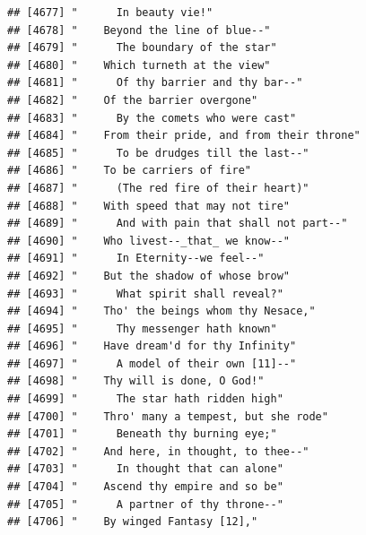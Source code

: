 \documentclass{article}\usepackage[]{graphicx}\usepackage[]{color}
\makeatletter
\newenvironment{kframe}{%
 \def\at@end@of@kframe{}%
 \ifinner\ifhmode%
  \def\at@end@of@kframe{\end{minipage}}%
  \begin{minipage}{\columnwidth}%
 \fi\fi%
 \def\FrameCommand##1{\hskip\@totalleftmargin \hskip-\fboxsep
 \colorbox{shadecolor}{##1}\hskip-\fboxsep
     \hskip-\linewidth \hskip-\@totalleftmargin \hskip\columnwidth}%
 \MakeFramed {\advance\hsize-\width
   \@totalleftmargin\z@ \linewidth\hsize
   \@setminipage}}%
 {\par\unskip\endMakeFramed%
 \at@end@of@kframe}
\newenvironment{knitrout}{}{} %
\makeatother
\begin{document}
\begin{knitrout}
\begin{kframe}
\begin{verbatim}
## [4677] "      In beauty vie!"                                                        
## [4678] "    Beyond the line of blue--"                                               
## [4679] "      The boundary of the star"                                              
## [4680] "    Which turneth at the view"                                               
## [4681] "      Of thy barrier and thy bar--"                                          
## [4682] "    Of the barrier overgone"                                                 
## [4683] "      By the comets who were cast"                                           
## [4684] "    From their pride, and from their throne"                                 
## [4685] "      To be drudges till the last--"                                         
## [4686] "    To be carriers of fire"                                                  
## [4687] "      (The red fire of their heart)"                                         
## [4688] "    With speed that may not tire"                                            
## [4689] "      And with pain that shall not part--"                                   
## [4690] "    Who livest--_that_ we know--"                                            
## [4691] "      In Eternity--we feel--"                                                
## [4692] "    But the shadow of whose brow"                                            
## [4693] "      What spirit shall reveal?"                                             
## [4694] "    Tho' the beings whom thy Nesace,"                                        
## [4695] "      Thy messenger hath known"                                              
## [4696] "    Have dream'd for thy Infinity"                                           
## [4697] "      A model of their own [11]--"                                           
## [4698] "    Thy will is done, O God!"                                                
## [4699] "      The star hath ridden high"                                             
## [4700] "    Thro' many a tempest, but she rode"                                      
## [4701] "      Beneath thy burning eye;"                                              
## [4702] "    And here, in thought, to thee--"                                         
## [4703] "      In thought that can alone"                                             
## [4704] "    Ascend thy empire and so be"                                             
## [4705] "      A partner of thy throne--"                                             
## [4706] "    By winged Fantasy [12],"                                                 

\end{verbatim}
\end{kframe}
\end{knitrout}
\end{document}

